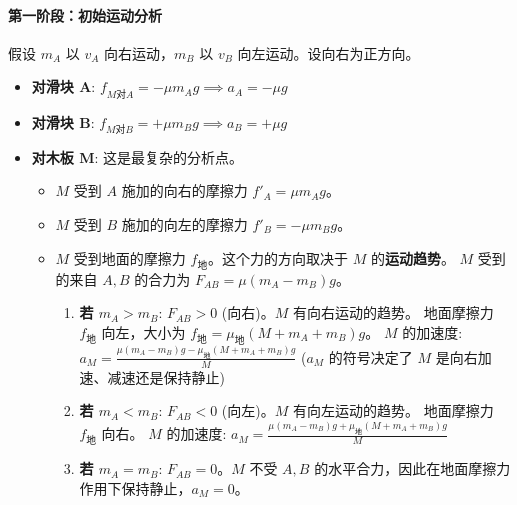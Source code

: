 \documentclass[a4paper,11pt]{ctexart}
\begin{document}
\paragraph{第一阶段：初始运动分析}
假设 $m_A$ 以 $v_A$ 向右运动，$m_B$ 以 $v_B$ 向左运动。设向右为正方向。
\begin{itemize}
    \item \textbf{对滑块 A}: $f_{M对A} = -\mu m_A g \implies a_A = -\mu g$
    \item \textbf{对滑块 B}: $f_{M对B} = +\mu m_B g \implies a_B = +\mu g$
    \item \textbf{对木板 M}: 这是最复杂的分析点。
        \begin{itemize}
            \item $M$ 受到 $A$ 施加的向右的摩擦力 $f'_{A} = \mu m_A g$。
            \item $M$ 受到 $B$ 施加的向左的摩擦力 $f'_{B} = -\mu m_B g$。
            \item $M$ 受到地面的摩擦力 $f_{地}$。这个力的方向取决于 $M$ 的\textbf{运动趋势}。
            $M$ 受到的来自 $A, B$ 的合力为 $F_{AB} = \mu(m_A - m_B)g$。
            \begin{enumerate}
                \item \textbf{若 $m_A > m_B$}: $F_{AB} > 0$ (向右)。$M$ 有向右运动的趋势。
                地面摩擦力 $f_{地}$ 向左，大小为 $f_{地} = \mu_{地}(M+m_A+m_B)g$。
                $M$ 的加速度: \textcolor{FormulaColor}{$a_M = \frac{\mu(m_A - m_B)g - \mu_{地}(M+m_A+m_B)g}{M}$}
                ($a_M$ 的符号决定了 $M$ 是向右加速、减速还是保持静止)
                
                \item \textbf{若 $m_A < m_B$}: $F_{AB} < 0$ (向左)。$M$ 有向左运动的趋势。
                地面摩擦力 $f_{地}$ 向右。
                $M$ 的加速度: \textcolor{FormulaColor}{$a_M = \frac{\mu(m_A - m_B)g + \mu_{地}(M+m_A+m_B)g}{M}$}
                
                \item \textbf{若 $m_A = m_B$}: $F_{AB} = 0$。$M$ 不受 $A, B$ 的水平合力，因此在地面摩擦力作用下保持静止，$a_M = 0$。
            \end{enumerate}
        \end{itemize}
\end{itemize}
\end{document}
